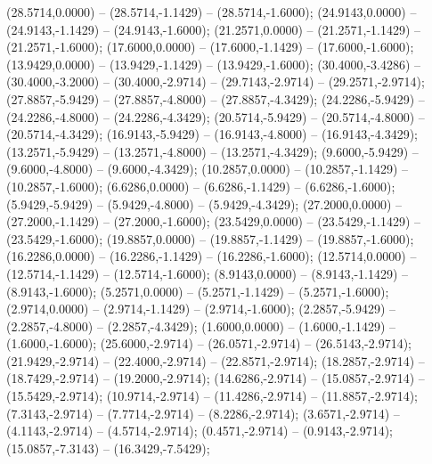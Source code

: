    (28.5714,0.0000) -- (28.5714,-1.1429) -- (28.5714,-1.6000);
   (24.9143,0.0000) -- (24.9143,-1.1429) -- (24.9143,-1.6000);
   (21.2571,0.0000) -- (21.2571,-1.1429) -- (21.2571,-1.6000);
   (17.6000,0.0000) -- (17.6000,-1.1429) -- (17.6000,-1.6000);
   (13.9429,0.0000) -- (13.9429,-1.1429) -- (13.9429,-1.6000);
   (30.4000,-3.4286) -- (30.4000,-3.2000) -- (30.4000,-2.9714) -- (29.7143,-2.9714) -- (29.2571,-2.9714);
   (27.8857,-5.9429) -- (27.8857,-4.8000) -- (27.8857,-4.3429);
   (24.2286,-5.9429) -- (24.2286,-4.8000) -- (24.2286,-4.3429);
   (20.5714,-5.9429) -- (20.5714,-4.8000) -- (20.5714,-4.3429);
   (16.9143,-5.9429) -- (16.9143,-4.8000) -- (16.9143,-4.3429);
   (13.2571,-5.9429) -- (13.2571,-4.8000) -- (13.2571,-4.3429);
   (9.6000,-5.9429) -- (9.6000,-4.8000) -- (9.6000,-4.3429);
   (10.2857,0.0000) -- (10.2857,-1.1429) -- (10.2857,-1.6000);
   (6.6286,0.0000) -- (6.6286,-1.1429) -- (6.6286,-1.6000);
   (5.9429,-5.9429) -- (5.9429,-4.8000) -- (5.9429,-4.3429);
   (27.2000,0.0000) -- (27.2000,-1.1429) -- (27.2000,-1.6000);
   (23.5429,0.0000) -- (23.5429,-1.1429) -- (23.5429,-1.6000);
   (19.8857,0.0000) -- (19.8857,-1.1429) -- (19.8857,-1.6000);
   (16.2286,0.0000) -- (16.2286,-1.1429) -- (16.2286,-1.6000);
   (12.5714,0.0000) -- (12.5714,-1.1429) -- (12.5714,-1.6000);
   (8.9143,0.0000) -- (8.9143,-1.1429) -- (8.9143,-1.6000);
   (5.2571,0.0000) -- (5.2571,-1.1429) -- (5.2571,-1.6000);
   (2.9714,0.0000) -- (2.9714,-1.1429) -- (2.9714,-1.6000);
   (2.2857,-5.9429) -- (2.2857,-4.8000) -- (2.2857,-4.3429);
   (1.6000,0.0000) -- (1.6000,-1.1429) -- (1.6000,-1.6000);
   (25.6000,-2.9714) -- (26.0571,-2.9714) -- (26.5143,-2.9714);
   (21.9429,-2.9714) -- (22.4000,-2.9714) -- (22.8571,-2.9714);
   (18.2857,-2.9714) -- (18.7429,-2.9714) -- (19.2000,-2.9714);
   (14.6286,-2.9714) -- (15.0857,-2.9714) -- (15.5429,-2.9714);
   (10.9714,-2.9714) -- (11.4286,-2.9714) -- (11.8857,-2.9714);
   (7.3143,-2.9714) -- (7.7714,-2.9714) -- (8.2286,-2.9714);
   (3.6571,-2.9714) -- (4.1143,-2.9714) -- (4.5714,-2.9714);
   (0.4571,-2.9714) -- (0.9143,-2.9714);
   (15.0857,-7.3143) -- (16.3429,-7.5429);
